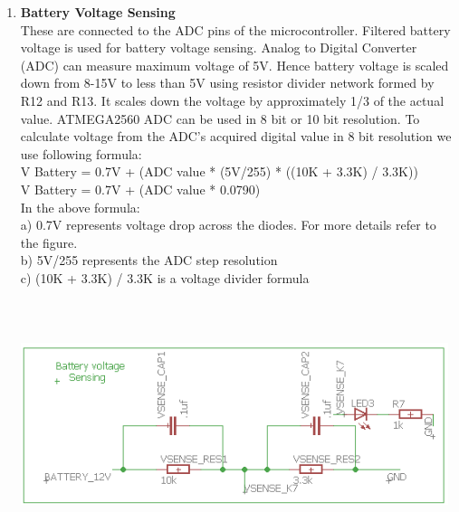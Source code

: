 \documentclass[a4paper,12pt,oneside]{book}
\begin{document}
\begin{enumerate}
    \newpage\item \textbf{Battery Voltage Sensing}
    \\[0.5cm]These are connected to the ADC pins of the microcontroller.
    Filtered battery voltage is used for battery voltage sensing. Analog to Digital Converter (ADC) can measure maximum voltage of 5V. Hence battery voltage is scaled down from 8-15V to less
    than 5V using resistor divider network formed by R12 and R13. It scales down the voltage by approximately 1/3 of the actual value. ATMEGA2560 ADC can be used in 8 bit or 10 bit resolution.
    To calculate voltage from the ADC’s acquired digital value in 8 bit resolution we use following formula:\\
    V Battery = 0.7V + (ADC value * (5V/255) * ((10K + 3.3K) / 3.3K))\\
    V Battery = 0.7V + (ADC value * 0.0790)\\
    In the above formula:\\
    a) 0.7V represents voltage drop across the diodes. For more details refer to the figure.\\
    b) 5V/255 represents the ADC step resolution\\
    c) (10K + 3.3K) / 3.3K is a voltage divider formula
    \vspace*{1cm}
    \\\hfill\includegraphics[width=12.5cm, height=8cm]{bvs}
    

\end{enumerate}
\end{document}
